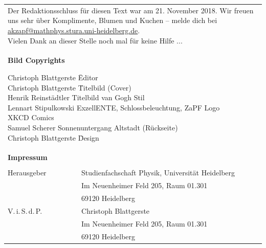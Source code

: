 \documentclass{scrbook}
\begin{document}
\null
\newpage
{}
\vspace*{\fill}
    \begin{tabular*}{\textwidth}{ll}
        \multicolumn{2}{l}{
            \parbox{\textwidth}{
                Der Redaktionsschluss für diesen Text war am 21. November 2018. Wir freuen uns
                sehr über Komplimente, Blumen und Kuchen -- melde dich bei
                \href{mailto:akzapf@mathphys.stura.uni-heidelberg.de}{akzapf@mathphys.stura.uni-heidelberg.de}. \\
                Vielen Dank an dieser Stelle noch mal für keine Hilfe ... 
            }
            \vspace{1cm}
        }\\
	\multicolumn{2}{l}{
	\parbox{0.77\textwidth}{
       	\textbf{Bild Copyrights}
       	\begin{tabbing}
        Christoph Blattgerste \quad \quad \= Editor \\
		Christoph Blattgerste \quad \quad \=  Titelbild (Cover) \\		
		Henrik Reinstädtler\> Titelbild van Gogh Stil \\
		Lennart Stipulkowski \> ExzellENTE, Schlossbeleuchtung, ZaPF Logo \\
		XKCD\footnotemark \> Comics \\
		Samuel Scherer\footnotemark \> Sonnenuntergang Altstadt (Rückseite) \\
        Christoph Blattgerste \quad \quad \= Design	
		\end{tabbing}
       	}
      }\\  

        \textbf{Impressum} \\ \\
        Herausgeber & Studienfachschaft Physik, Universität Heidelberg \\
        & Im Neuenheimer Feld 205, Raum 01.301\\
        & 69120 Heidelberg\\
        V.\,i.\,S.\,d.\,P. & Christoph Blattgerste\\
        & Im Neuenheimer Feld 205, Raum 01.301\\
        & 69120 Heidelberg\\
    \end{tabular*}
\end{document}

